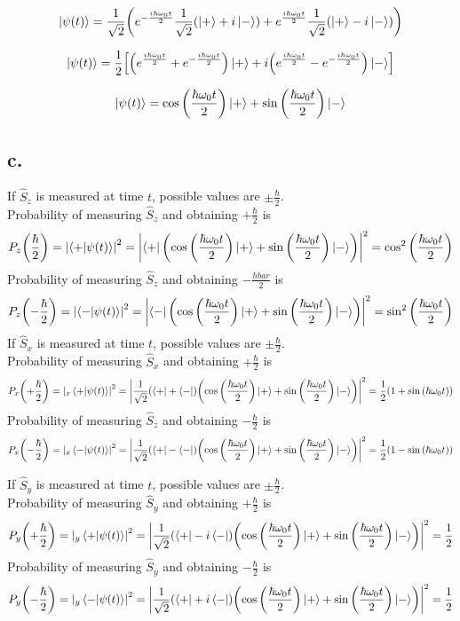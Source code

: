 \documentclass[12pt]{article}
\begin{document}
\[\ket{\psi(t)}=\frac{1}{\sqrt{2}}\qty(e^{-\frac{i\hbar\omega_0 t}{2}}\frac{1}{\sqrt{2}}\qty(\ket{+}+i\ket{-})+e^{\frac{i\hbar\omega_0 t}{2}}\frac{1}{\sqrt{2}}\qty(\ket{+}-i\ket{-}))\]

\[\ket{\psi(t)}=\frac{1}{2}\qty[\qty(e^{\frac{i\hbar\omega_0 t}{2}}+e^{-\frac{i\hbar\omega_0 t}{2}})\ket{+}+i\qty(e^{\frac{i\hbar\omega_0 t}{2}}-e^{-\frac{i\hbar\omega_0 t}{2}})\ket{-}]\]

\[\ket{\psi(t)}=\cos\qty({\frac{\hbar\omega_0 t}{2}})\ket{+}+\sin\qty({\frac{\hbar\omega_0 t}{2}})\ket{-}\]

\subsection*{c.}

If $\hat{S}_z$ is measured at time $t$, possible values are $\pm\frac{\hbar}{2}$. \\Probability of measuring $\hat{S}_z$ and obtaining $+\frac{\hbar}{2}$ is 
\[P_z\qty(\frac{\hbar}{2})=\qty|\braket{+}{\psi(t)}|^2=\qty|\bra{+}\qty(\cos\qty({\frac{\hbar\omega_0 t}{2}})\ket{+}+\sin\qty({\frac{\hbar\omega_0 t}{2}})\ket{-})|^2=\cos^2\qty({\frac{\hbar\omega_0 t}{2}})\]
Probability of measuring $\hat{S}_z$ and obtaining $-\frac{hbar}{2}$ is 
\[P_z\qty(-\frac{\hbar}{2})=\qty|\braket{-}{\psi(t)}|^2=\qty|\bra{-}\qty(\cos\qty({\frac{\hbar\omega_0 t}{2}})\ket{+}+\sin\qty({\frac{\hbar\omega_0 t}{2}})\ket{-})|^2=\sin^2\qty({\frac{\hbar\omega_0 t}{2}})\]
If $\hat{S}_x$ is measured at time $t$, possible values are $\pm\frac{\hbar}{2}$. \\Probability of measuring $\hat{S}_x$ and obtaining $+\frac{\hbar}{2}$ is 
\[P_x\qty(+\frac{\hbar}{2})=\qty|_x\braket{+}{\psi(t)}|^2=\qty|\frac{1}{\sqrt{2}}\qty(\bra{+}+\bra{-})\qty(\cos\qty({\frac{\hbar\omega_0 t}{2}})\ket{+}+\sin\qty({\frac{\hbar\omega_0 t}{2}})\ket{-})|^2=\frac{1}{2}\qty(1+\sin\qty({\hbar\omega_0 t}))\]
Probability of measuring $\hat{S}_z$ and obtaining $-\frac{\hbar}{2}$ is 
\[P_x\qty(-\frac{\hbar}{2})=\qty|_x\braket{-}{\psi(t)}|^2=\qty|\frac{1}{\sqrt{2}}\qty(\bra{+}-\bra{-})\qty(\cos\qty({\frac{\hbar\omega_0 t}{2}})\ket{+}+\sin\qty({\frac{\hbar\omega_0 t}{2}})\ket{-})|^2=\frac{1}{2}\qty(1-\sin\qty({\hbar\omega_0 t}))\]

If $\hat{S}_y$ is measured at time $t$, possible values are $\pm\frac{\hbar}{2}$. \\Probability of measuring $\hat{S}_y$ and obtaining $+\frac{\hbar}{2}$ is 
\[P_y\qty(+\frac{\hbar}{2})=\qty|_y\braket{+}{\psi(t)}|^2=\qty|\frac{1}{\sqrt{2}}\qty(\bra{+}-i\bra{-})\qty(\cos\qty({\frac{\hbar\omega_0 t}{2}})\ket{+}+\sin\qty({\frac{\hbar\omega_0 t}{2}})\ket{-})|^2=\frac{1}{2}\]
Probability of measuring $\hat{S}_y$ and obtaining $-\frac{\hbar}{2}$ is 
\[P_y\qty(-\frac{\hbar}{2})=\qty|_y\braket{-}{\psi(t)}|^2=\qty|\frac{1}{\sqrt{2}}\qty(\bra{+}+i\bra{-})\qty(\cos\qty({\frac{\hbar\omega_0 t}{2}})\ket{+}+\sin\qty({\frac{\hbar\omega_0 t}{2}})\ket{-})|^2=\frac{1}{2}\]
\end{document}
